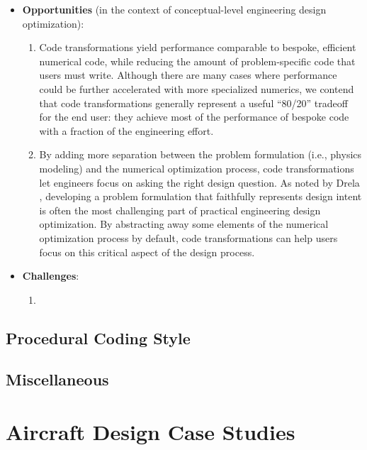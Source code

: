 \begin{itemize}
    \item \textbf{Opportunities} (in the context of conceptual-level engineering design optimization):
    \begin{enumerate}
        \item Code transformations yield performance comparable to bespoke, efficient numerical code, while reducing the amount of problem-specific code that users must write. Although there are many cases where performance could be further accelerated with more specialized numerics, we contend that code transformations generally represent a useful ``80/20'' tradeoff for the end user: they achieve most of the performance of bespoke code with a fraction of the engineering effort.
        \item By adding more separation between the problem formulation (i.e., physics modeling) and the numerical optimization process, code transformations let engineers focus on asking the right design question. As noted by Drela \cite{drela_pros_1998}, developing a problem formulation that faithfully represents design intent is often the most challenging part of practical engineering design optimization. By abstracting away some elements of the numerical optimization process by default, code transformations can help users focus on this critical aspect of the design process.
    \end{enumerate}
    \item \textbf{Challenges}:
    \begin{enumerate}
        \item %
    \end{enumerate}
\end{itemize}


\subsection{Procedural Coding Style}

\subsection{Miscellaneous} %


\section{Aircraft Design Case Studies}

